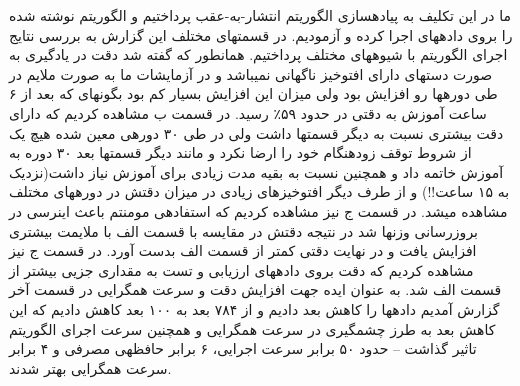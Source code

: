 \documentclass[10pt,a4paper]{article}
\newcommand{\نیمفاصله}{\halfspace}
\renewcommand{\ }{\halfspace}
\newcommand{\بپ}{انتشار-به-عقب }
\newcommand{\منست}{\lr{MNIST} }
\newcommand{\مسی}{\lr{MSE} }
\newcommand{\فوتنت}[1]{\footnote{\lr{#1}}}
\begin{document}
\قسمت{نتیجه\ گیری و جمع\ بندی}
ما در این تکلیف به پیاده\ سازی الگوریتم \بپ پرداختیم و الگوریتم نوشته شده را بروی داده\ های \منست اجرا کرده و آزمودیم. در قسمت\ های مختلف این گزارش به بررسی نتایج اجرای الگوریتم با شیوه\ های مختلف پرداختیم. همان\ طور که گفته شد دقت در یادگیری به صورت دسته\ ای دارای افت\ وخیز ناگهانی نمی\ باشد و در آزمایشات ما به صورت ملایم در طی دوره\ ها رو افزایش بود ولی میزان این افزایش بسیار کم بود بگونه\ ای که بعد از ۶ ساعت آموزش به دقتی در حدود ۵۹٪ رسید. در قسمت ب مشاهده کردیم که دارای دقت بیشتری نسبت به دیگر قسمت\ ها داشت ولی در طی ۳۰ دوره\ ی معین شده هیچ یک از شروط توقف زودهنگام خود را ارضا نکرد و مانند دیگر قسمت\ ها بعد ۳۰ دوره به آموزش خاتمه داد و همچنین نسبت به بقیه مدت زیادی برای آموزش نیاز داشت(نزدیک به ۱۵ ساعت!!) و از طرف دیگر افت\ وخیزهای زیادی در میزان دقتش در دوره\ های مختلف مشاهده می\ شد. در قسمت ج نیز مشاهده کردیم که استفاده\ ی مومنتم باعث اینرسی در بروزرسانی وزن\ ها شد در نتیجه دقتش در مقایسه با قسمت الف با ملایمت بیشتری افزایش یافت و در نهایت دقتی کمتر از قسمت الف بدست آورد. در قسمت ج نیز مشاهده کردیم که دقت بروی داده\ های ارزیابی و تست به مقداری جزیی بیشتر از قسمت الف شد.
به عنوان ایده جهت افزایش دقت و سرعت همگرایی در قسمت آخر گزارش آمدیم داده\ ها را کاهش بعد دادیم و از ۷۸۴ بعد به ۱۰۰ بعد کاهش دادیم که این کاهش بعد به طرز چشم\ گیری در سرعت همگرایی و همچنین سرعت اجرای الگوریتم تاثیر گذاشت -- حدود ۵۰ برابر سرعت اجرایی، ۶ برابر حافظه\ ی مصرفی و ۴ برابر سرعت همگرایی بهتر شدند.
\end{document}
